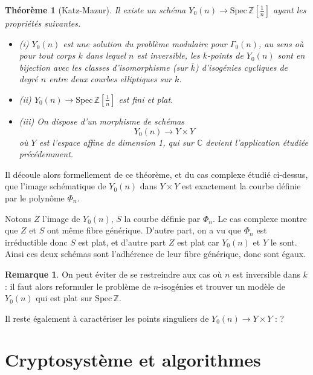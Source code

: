 \documentclass[11pt,a4paper]{article}
\newcommand{\Z}{\mathbb{Z}}
\newcommand{\C}{\mathbb{C}}
\newcommand{\vers}{\rightarrow}
\newcommand{\Spec}{\mathrm{Spec}\,}
\newtheorem{thm}{Théorème}[subsection]
\theoremstyle{definition}
\newtheorem*{rem}{Remarque}
\begin{document}
\begin{thm}[Katz-Mazur]
Il existe un schéma $Y_0(n)\vers \Spec \Z\left[\frac{1}{n}\right]$ ayant les propriétés suivantes.

\begin{itemize}

\item{(i)} $Y_0(n)$ est une solution du problème modulaire pour $\Gamma_0(n)$, au sens où pour tout corps $k$ dans lequel $n$ est inversible, les $k$-points de $Y_0(n)$ sont en bijection avec les classes d'isomorphisme (sur $\bar{k}$) d'isogénies cycliques de degré $n$ entre deux courbes elliptiques sur $k$.

\item{(ii)} $Y_0(n)\vers \Spec \Z\left[\frac{1}{n}\right]$ est fini et plat.

\item({iii)} On dispose d'un morphisme de schémas 
$$Y_0(n) \vers Y\times Y$$
où $Y$ est l'espace affine de dimension 1, qui sur $\C$ devient l'application étudiée précédemment.

\end{itemize}

\end{thm}

Il découle alors formellement de ce théorème, et du cas complexe étudié ci-dessus, que l'image schématique de $Y_0(n)$ dans $Y\times Y$ est exactement la courbe définie par le polynôme $\Phi_n$.

Notons $Z$ l'image de $Y_0(n)$, $S$ la courbe définie par $\Phi_n$. Le cas complexe montre que $Z$ et $S$ ont même fibre générique. D'autre part, on a vu que $\Phi_n$ est irréductible donc $S$ est plat, et d'autre part $Z$ est plat car $Y_0(n)$ et $Y$ le sont. Ainsi ces deux schémas sont l'adhérence de leur fibre générique, donc sont égaux.


\begin{rem}

On peut éviter de se restreindre aux cas où $n$ est inversible dans $k$ : il faut alors reformuler le problème de $n$-isogénies et trouver un modèle de $Y_0(n)$ qui est plat sur $\Spec\Z$.

\end{rem}

Il reste également à caractériser les points singuliers de $Y_0(n)\vers Y\times Y$ : ?


\newpage

\section{Cryptosystème et algorithmes}
\end{document}
